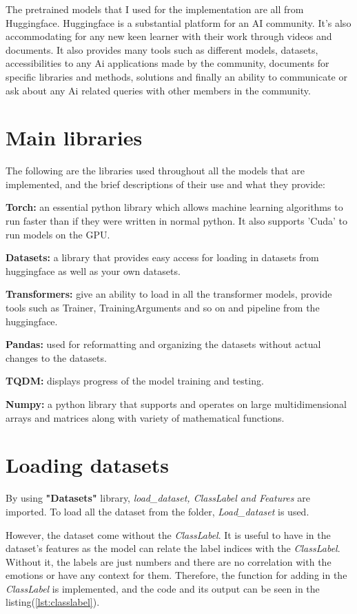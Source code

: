 The pretrained models that I used for the implementation are all from Huggingface\cite{Hugging_Face}. Huggingface is a substantial platform for an AI community. It's also accommodating for any new keen learner with their work through videos and documents. It also provides many tools such as different models, datasets, accessibilities to any Ai applications made by the community, documents for specific libraries and methods, solutions and finally an ability to communicate or ask about any Ai related queries with other members in the community.

\section{Main libraries}
The following are the libraries used throughout all the models that are implemented, and the brief descriptions of their use and what they provide:

\textbf{Torch:} an essential python library which allows machine learning algorithms to run faster than if they were written in normal python. It also supports 'Cuda' to run models on the GPU.

\textbf{Datasets:} a library that provides easy access for loading in datasets from huggingface as well as your own datasets.

\textbf{Transformers:} give an ability to load in all the transformer models, provide tools such as Trainer, TrainingArguments and so on and pipeline from the huggingface.

\textbf{Pandas:} used for reformatting and organizing the datasets without actual changes to the datasets.

\textbf{TQDM:} displays progress of the model training and testing.

\textbf{Numpy:} a python library that supports and operates on large multidimensional arrays and matrices along with variety of mathematical functions.

\section{Loading datasets}

By using \textbf{"Datasets"} library, \textit{load\_dataset, ClassLabel and Features} are imported. To load all the dataset from the folder, \emph{Load\_dataset} is used. 

However, the dataset come without the \emph{ClassLabel}. It is useful to have in the dataset's features as the model can relate the label indices with the \emph{ClassLabel}. Without it, the labels are just numbers and there are no correlation with the emotions or have any context for them. Therefore, the function for adding in the \emph{ClassLabel} is implemented, and the code and its output can be seen in the listing(\ref{lst:classlabel}). 
\bigskip

